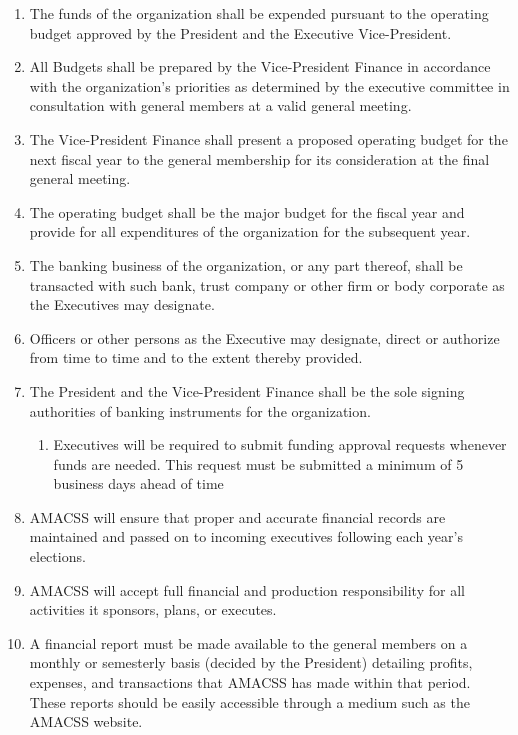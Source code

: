 \documentclass[12pt,a4paper]{article}
\begin{document}
\begin{enumerate}
\item The funds of the organization shall be expended pursuant to the operating budget approved by the President and the Executive Vice-President.

\item All Budgets shall be prepared by the Vice-President Finance in accordance with the organization's priorities as determined by the executive committee in consultation with general members at a valid general meeting.

\item The Vice-President Finance shall present a proposed operating budget for the next fiscal year to the general membership for its consideration at the final general meeting.

\item The operating budget shall be the major budget for the fiscal year and provide for all expenditures of the organization for the subsequent year.

\item The banking business of the organization, or any part thereof, shall be transacted with such bank, trust company or other firm or body corporate as the Executives may designate.

\item Officers or other persons as the Executive may designate, direct or authorize from time to time and to the extent thereby provided.

\item The President and the Vice-President Finance shall be the sole signing authorities of banking instruments for the organization.

\begin{enumerate}
\item Executives will be required to submit funding approval requests whenever funds are needed. This request must be submitted a minimum of 5 business days ahead of time
\end{enumerate}

\item AMACSS will ensure that proper and accurate financial records are maintained and passed on to incoming executives following each year's elections.

\item AMACSS will accept full financial and production responsibility for all activities it sponsors, plans, or executes.

\item A financial report must be made available to the general members on a monthly or semesterly basis (decided by the President) detailing profits, expenses, and transactions that AMACSS has made within that period. These reports should be easily accessible through a medium such as the AMACSS website.
\end{enumerate}
\end{document}
